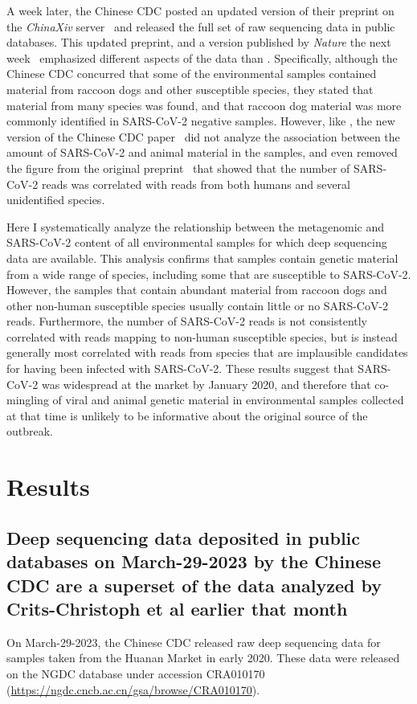 \documentclass[9pt,twocolumn,twoside]{gsajnl_modified}
\begin{document}
A week later, the Chinese CDC posted an updated version of their preprint on the \textit{ChinaXiv} server~\citep{liu2023surveillance-chinaxiv} and released the full set of raw sequencing data in public databases.
This updated preprint, and a version published by \textit{Nature} the next week~\citep{liu2023surveillance} emphasized different aspects of the data than \citet{crits2023genetic}.
Specifically, although the Chinese CDC concurred that some of the environmental samples contained material from raccoon dogs and other susceptible species, they stated that material from many species was found, and that raccoon dog material was more commonly identified in SARS-CoV-2 negative samples.
However, like \citet{crits2023genetic}, the new version of the Chinese CDC paper~\citep{liu2023surveillance} did not analyze the association between the amount of SARS-CoV-2 and animal material in the samples, and even removed the figure from the original preprint~\citep{liu2022surveillance} that showed that the number of SARS-CoV-2 reads was correlated with reads from both humans and several unidentified species.

Here I systematically analyze the relationship between the metagenomic and SARS-CoV-2 content of all environmental samples for which deep sequencing data are available.
This analysis confirms that samples contain genetic material from a wide range of species, including some that are susceptible to SARS-CoV-2.
However, the samples that contain abundant material from raccoon dogs and other non-human susceptible species usually contain little or no SARS-CoV-2 reads.
Furthermore, the number of SARS-CoV-2 reads is not consistently correlated with reads mapping to non-human susceptible species, but is instead generally most correlated with reads from species that are implausible candidates for having been infected with SARS-CoV-2.
These results suggest that SARS-CoV-2 was widespread at the market by January 2020, and therefore that co-mingling of viral and animal genetic material in environmental samples collected at that time is unlikely to be informative about the original source of the outbreak.

\section{Results}

\subsection{Deep sequencing data deposited in public databases on March-29-2023 by the Chinese CDC are a superset of the data analyzed by Crits-Christoph et al earlier that month}
On March-29-2023, the Chinese CDC released raw deep sequencing data for samples taken from the Huanan Market in early 2020.
These data were released on the NGDC database under accession CRA010170 (\url{https://ngdc.cncb.ac.cn/gsa/browse/CRA010170}).
\end{document}
